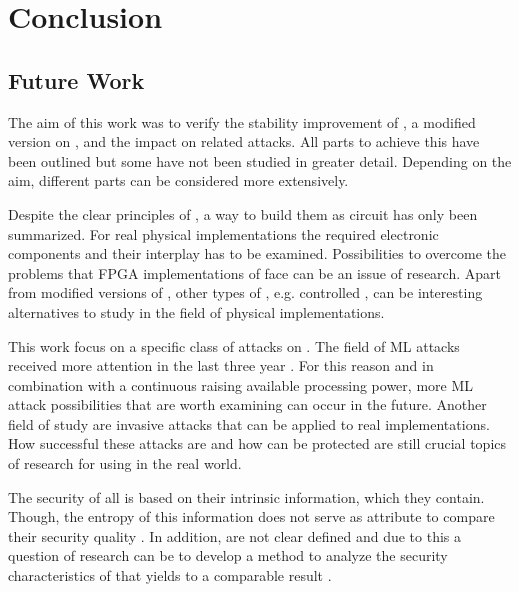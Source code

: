 \chapter{Conclusion}
\label{cap:conclusion}

\section{Future Work}

The aim of this work was to verify the stability improvement of \mpufs, a modified version on \apufs, and the impact on related attacks.
All parts to achieve this have been outlined but some have not been studied in greater detail.
Depending on the aim, different parts can be considered more extensively.

Despite the clear principles of \apufs, a way to build them as circuit has only been summarized.
For real physical implementations the required electronic components and their interplay has to be examined.
Possibilities to overcome the problems that \ac{FPGA} implementations of \apufs face can be an issue of research.
Apart from modified versions of \apufs, other types of \pufs, e.g. controlled \pufs, can be interesting alternatives to study in the field of physical implementations.

This work focus on a specific class of attacks on \pufs.
The field of \ac{ML} attacks received more attention in the last three year \cite{Google2017MachineTrends}.
For this reason and in combination with a continuous raising available processing power, more \ac{ML} attack possibilities that are worth examining can occur in the future.
Another field of study are invasive attacks that can be applied to real \puf implementations.
How successful these attacks are and how \pufs can be protected are still crucial topics of research for using \pufs in the real world.

The security of all \pufs is based on their intrinsic information, which they contain.
Though, the entropy of this information does not serve as attribute to compare their security quality \cite{Ruhrmair2010ModelingFunctions}.
In addition, \pufs are not clear defined and due to this a question of research can be to develop a method to analyze the security characteristics of \pufs that yields to a comparable result \cite{Becker2015ThePUFs}.

